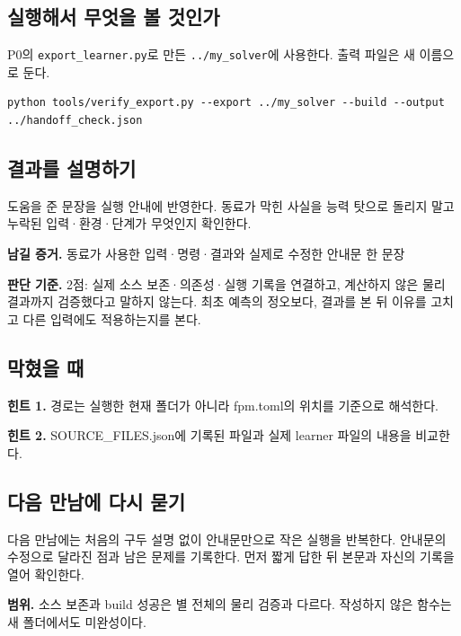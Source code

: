 \documentclass[
  10pt,
  a4paper,
]{article}
\begin{document}
\newpage

\subsection{실행해서 무엇을 볼
것인가}\label{uxc2e4uxd589uxd574uxc11c-uxbb34uxc5c7uxc744-uxbcfc-uxac83uxc778uxac00}

P0의 \texttt{export\_learner.py}로 만든 \texttt{../my\_solver}에
사용한다. 출력 파일은 새 이름으로 둔다.

\begin{verbatim}
python tools/verify_export.py --export ../my_solver --build --output ../handoff_check.json
\end{verbatim}

\subsection{결과를
설명하기}\label{uxacb0uxacfcuxb97c-uxc124uxba85uxd558uxae30}

도움을 준 문장을 실행 안내에 반영한다. 동료가 막힌 사실을 능력 탓으로
돌리지 말고 누락된 입력·환경·단계가 무엇인지 확인한다.

\textbf{남길 증거.} 동료가 사용한 입력·명령·결과와 실제로 수정한 안내문
한 문장

\textbf{판단 기준.} 2점: 실제 소스 보존·의존성·실행 기록을 연결하고,
계산하지 않은 물리 결과까지 검증했다고 말하지 않는다. 최초 예측의
정오보다, 결과를 본 뒤 이유를 고치고 다른 입력에도 적용하는지를 본다.

\subsection{막혔을 때}\label{uxb9c9uxd614uxc744-uxb54c}

\textbf{힌트 1.} 경로는 실행한 현재 폴더가 아니라 fpm.toml의 위치를
기준으로 해석한다.

\textbf{힌트 2.} SOURCE\_FILES.json에 기록된 파일과 실제 learner 파일의
내용을 비교한다.

\subsection{다음 만남에 다시
묻기}\label{uxb2e4uxc74c-uxb9ccuxb0a8uxc5d0-uxb2e4uxc2dc-uxbb3buxae30}

다음 만남에는 처음의 구두 설명 없이 안내문만으로 작은 실행을 반복한다.
안내문의 수정으로 달라진 점과 남은 문제를 기록한다. 먼저 짧게 답한 뒤
본문과 자신의 기록을 열어 확인한다.

\textbf{범위.} 소스 보존과 build 성공은 별 전체의 물리 검증과 다르다.
작성하지 않은 함수는 새 폴더에서도 미완성이다.
\end{document}
